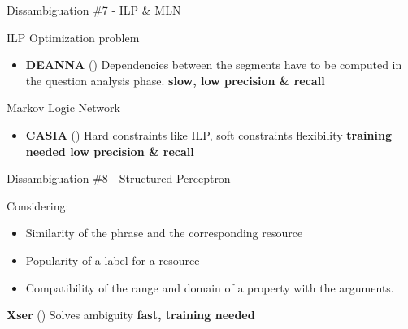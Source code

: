 \documentclass{beamer}
\begin{document}
\begin{frame}{Dissambiguation \#7 - ILP \& MLN}
  \begin{card}
    ILP Optimization problem
    \begin{itemize}
      \item \textbf{DEANNA} (\cite{yahya2013a}) Dependencies between the segments have to be computed in the question analysis phase. \textbf{slow, low precision \& recall}
    \end{itemize}
  \end{card}
  \begin{card}
    Markov Logic Network
    \begin{itemize}
      \item \textbf{CASIA} (\cite{he2014a}) Hard constraints like ILP, soft constraints flexibility \textbf{training needed low precision \& recall}
    \end{itemize}
  \end{card}
\end{frame}


\begin{frame}{Dissambiguation \#8 - Structured Perceptron}
  \begin{card}
    Considering:
    \begin{itemize}
      \item Similarity of the phrase and the corresponding resource
      \item Popularity of a label for a resource
      \item Compatibility of the range and domain of a property with the arguments.
    \end{itemize}
    \textbf{Xser} (\cite{xu2014a}) Solves ambiguity \textbf{fast, training needed}
  \end{card}
\end{frame}
\end{document}
